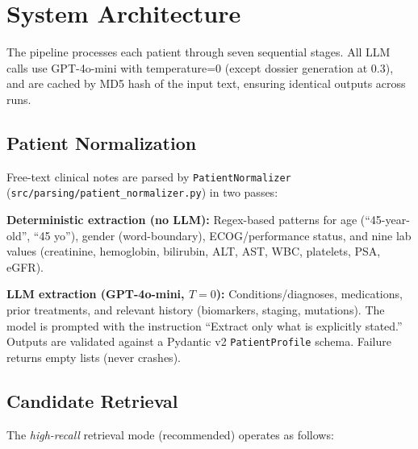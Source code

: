 \documentclass[10pt,twocolumn]{article}
\begin{document}
\section{System Architecture}
\label{sec:arch}

The pipeline processes each patient through seven sequential stages. All LLM calls
use GPT-4o-mini with temperature=0 (except dossier generation at 0.3), and are
cached by MD5 hash of the input text, ensuring identical outputs across runs.

\subsection{Patient Normalization}

Free-text clinical notes are parsed by \texttt{PatientNormalizer}
(\texttt{src/parsing/patient\_normalizer.py}) in two passes:

\textbf{Deterministic extraction (no LLM):} Regex-based patterns for age
(``45-year-old'', ``45 yo''), gender (word-boundary), ECOG/performance status,
and nine lab values (creatinine, hemoglobin, bilirubin, ALT, AST, WBC, platelets,
PSA, eGFR).

\textbf{LLM extraction (GPT-4o-mini, $T{=}0$):} Conditions/diagnoses, medications,
prior treatments, and relevant history (biomarkers, staging, mutations). The model
is prompted with the instruction ``Extract only what is explicitly stated.''
Outputs are validated against a Pydantic v2 \texttt{PatientProfile} schema.
Failure returns empty lists (never crashes).

\subsection{Candidate Retrieval}

The \textit{high-recall} retrieval mode (recommended) operates as follows:
\end{document}
